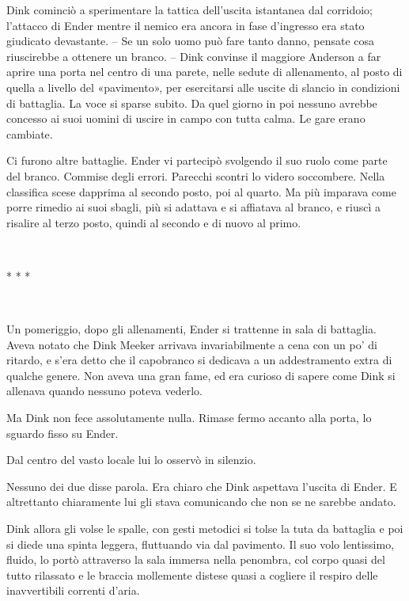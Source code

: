 {Dink cominciò a sperimentare la tattica dell'uscita istantanea dal
	corridoio; l'attacco di Ender mentre il nemico era ancora in fase
	d'ingresso era stato giudicato devastante. -- Se un solo uomo può fare
	tanto danno, pensate cosa riuscirebbe a ottenere un branco. -- Dink
	convinse il maggiore Anderson a far aprire una porta nel centro di una
	parete, nelle sedute di allenamento, al posto di quella a livello del
	«pavimento», per esercitarsi alle uscite di slancio in condizioni di
	battaglia. La voce si sparse subito. Da quel giorno in poi nessuno
	avrebbe concesso ai suoi uomini di uscire in campo con tutta calma. Le
	gare erano cambiate.}

{Ci furono altre battaglie. Ender vi partecipò svolgendo il suo ruolo
	come parte del branco. Commise degli errori. Parecchi scontri lo videro
	soccombere. Nella classifica scese dapprima al secondo posto, poi al
	quarto. Ma più imparava come porre rimedio ai suoi sbagli, più si
	adattava e si affiatava al branco, e riuscì a risalire al terzo posto,
	quindi al secondo e di nuovo al primo.}

{~}

\begin{center}
	{* * *}
\end{center}

{~}

{Un pomeriggio, dopo gli allenamenti, Ender si trattenne in sala di
	battaglia. Aveva notato che Dink Meeker arrivava invariabilmente a cena
	con un po' di ritardo, e s'era detto che il capobranco si dedicava a un
	addestramento extra di qualche genere. Non aveva una gran fame, ed era
	curioso di sapere come Dink si allenava quando nessuno poteva vederlo.}

{Ma Dink non fece assolutamente nulla. Rimase fermo accanto alla porta,
	lo sguardo fisso su Ender.}

{Dal centro del vasto locale lui lo osservò in silenzio.}

{Nessuno dei due disse parola. Era chiaro che Dink aspettava l'uscita di
	Ender. E altrettanto chiaramente lui gli stava comunicando che non se ne
	sarebbe andato.}

{Dink allora gli volse le spalle, con gesti metodici si tolse la tuta da
	battaglia e poi si diede una spinta leggera, fluttuando via dal
	pavimento. Il suo volo lentissimo, fluido, lo portò attraverso la sala
	immersa nella penombra, col corpo quasi del tutto rilassato e le braccia
	mollemente distese quasi a cogliere il respiro delle inavvertibili
	correnti d'aria.}


